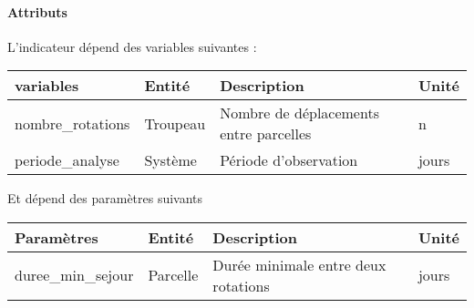 \documentclass[
]{article}
\begin{document}
\paragraph{Attributs}\label{attributs-19}

L'indicateur dépend des variables suivantes :

\begin{longtable}[]{@{}
  >{\raggedright\arraybackslash}p{}
  >{\raggedright\arraybackslash}p{}
  >{\raggedright\arraybackslash}p{}
  >{\raggedright\arraybackslash}p{}@{}}
\toprule\noalign{}
\begin{minipage}[b]{\linewidth}\raggedright
\textbf{variables}
\end{minipage} & \begin{minipage}[b]{\linewidth}\raggedright
\textbf{Entité}
\end{minipage} & \begin{minipage}[b]{\linewidth}\raggedright
\textbf{Description}
\end{minipage} & \begin{minipage}[b]{\linewidth}\raggedright
\textbf{Unité}
\end{minipage} \\
\midrule\noalign{}
\endhead
\bottomrule\noalign{}
\endlastfoot
nombre\_rotations & Troupeau & Nombre de déplacements entre parcelles &
n \\
periode\_analyse & Système & Période d'observation & jours \\
\end{longtable}

Et dépend des paramètres suivants

\begin{longtable}[]{@{}
  >{\raggedright\arraybackslash}p{}
  >{\raggedright\arraybackslash}p{}
  >{\raggedright\arraybackslash}p{}
  >{\raggedright\arraybackslash}p{}@{}}
\toprule\noalign{}
\begin{minipage}[b]{\linewidth}\raggedright
\textbf{Paramètres}
\end{minipage} & \begin{minipage}[b]{\linewidth}\raggedright
\textbf{Entité}
\end{minipage} & \begin{minipage}[b]{\linewidth}\raggedright
\textbf{Description}
\end{minipage} & \begin{minipage}[b]{\linewidth}\raggedright
\textbf{Unité}
\end{minipage} \\
\midrule\noalign{}
\endhead
\bottomrule\noalign{}
\endlastfoot
duree\_min\_sejour & Parcelle & Durée minimale entre deux rotations &
jours \\
\end{longtable}
\end{document}
